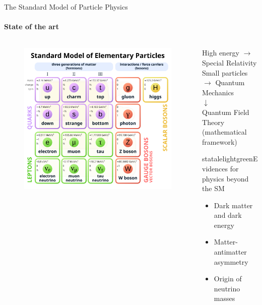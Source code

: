 \begin{frame}{The Standard Model of Particle Physics}
  \framesubtitle{State of the art}

  \begin{columns}
    
    \begin{column}{0.5\textwidth}

      \begin{figure}
        \centering
        \includegraphics[width = \textwidth]{imgs/standard-model.png}
      \end{figure}

    \end{column}

    

    \begin{column}{0.5 \textwidth}
    \begin{center}
        High energy $\to$ Special Relativity \\
        Small particles $\to$ Quantum Mechanics \\
        $\downarrow$ \\
        Quantum Field Theory \\
        (mathematical framework)
    \end{center}
    
    

      \begin{colorblock}[black]{statalelightgreen}{Evidences for physics beyond the SM}
        \begin{itemize}
          \item Dark matter and dark energy
          \item Matter-antimatter asymmetry
          \item Origin of neutrino masses
        \end{itemize}
      \end{colorblock}


\end{column}
\end{columns}
\end{frame}
